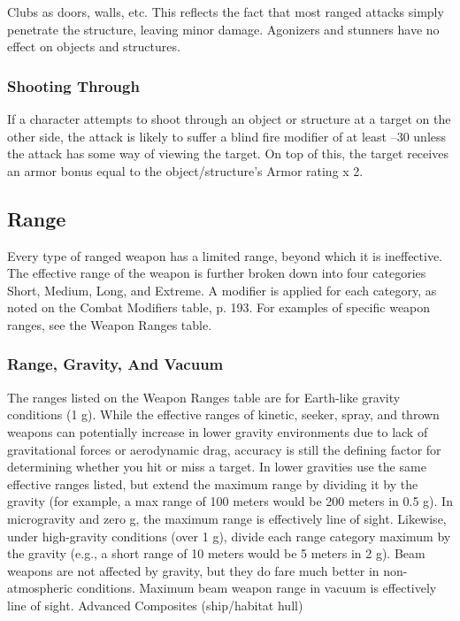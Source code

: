 Clubs
as doors, walls, etc. This reflects the fact that most 
ranged attacks simply penetrate the structure, leaving 
minor damage.
Agonizers and stunners have no effect on objects 
and structures.

\subsubsection{Shooting Through}

If a character attempts to shoot through an object or 
structure at a target on the other side, the attack is 
likely to suffer a blind fire modifier of at least –30 
unless the attack has some way of viewing the target. 
On top of this, the target receives an armor bonus 
equal to the object/structure's Armor rating x 2.

\subsection{Range}

Every type of ranged weapon has a limited range, 
beyond which it is ineffective. The effective range of 
the weapon is further broken down into four categories
Short, Medium, Long, and Extreme. A modifier
is applied for each category, as noted on the Combat 
Modifiers table, p. 193.
For examples of specific weapon ranges, see the 
Weapon Ranges table.

\subsubsection{Range, Gravity, And Vacuum}

The ranges listed on the Weapon Ranges table are for 
Earth-like gravity conditions (1 g). While the effective 
ranges of kinetic, seeker, spray, and thrown weapons 
can potentially increase in lower gravity environments 
due to lack of gravitational forces or aerodynamic 
drag, accuracy is still the defining factor for determining
whether you hit or miss a target. In lower gravities
use the same effective ranges listed, but extend
the maximum range by dividing it by the gravity (for 
example, a max range of 100 meters would be 200 
meters in 0.5 g). In microgravity and zero g, the maximum
range is effectively line of sight. Likewise, under
high-gravity conditions (over 1 g), divide each range 
category maximum by the gravity (e.g., a short range 
of 10 meters would be 5 meters in 2 g).
Beam weapons are not affected by gravity, but they 
do fare much better in non-atmospheric conditions. 
Maximum beam weapon range in vacuum is effectively
line of sight.
Advanced Composites 
(ship/habitat hull)

